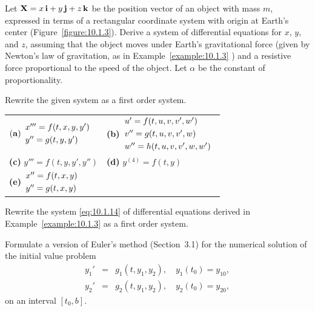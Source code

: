\begin{exerciselist}
  \item\label{exer:10.1.4} Let ${\bf X}=x\,{\bf i}+y\,{\bf j}+z\,{\bf k}$ be the position vector of
        an object with mass $m$, expressed in terms of a rectangular coordinate system with origin
        at Earth's center (Figure~\ref{figure:10.1.3}). Derive a system of differential equations
        for $x$, $y$, and $z$, assuming that the object moves under Earth's gravitational force
        (given by Newton's law of gravitation, as in Example~\ref{example:10.1.3} ) and a resistive
        force proportional to the speed of the object. Let $\alpha$ be the constant of
        proportionality.

  \item\label{exer:10.1.5} Rewrite the given system as a first order system.

  \begin{tabular}[t]{@{}p{168pt}@{}p{168pt}}
    ${\bf(a)}\begin{array}{lcc}x'''=f(t,x,y,y')\\[1\jot]y''= g(t,y,y')\end{array}$ & {\bf (b)}$\begin{array}{lcl}u'= f(t,u,v,v',w')\\[1\jot]v''=g(t,u,v,v',w) \\[1\jot]w''=h(t,u,v,v',w,w')\end{array}$ \\[30pt]
    {\bf (c)} $y'''= f(t,y,y',y'')$                                                & {\bf (d)} $y^{(4)}=f(t,y)$                                                                                         \\[20pt]
    {\bf (e)}$\begin{array}{lcc}x''=f(t,x,y)\\[1\jot]y''= g(t,x,y)\end{array}$
  \end{tabular}

  \item\label{exer:10.1.6} Rewrite the system \eqref{eq:10.1.14} of differential equations derived
        in Example~\ref{example:10.1.3} as a first order system.

  \item\label{exer:10.1.7} Formulate a version of Euler's method (Section~3.1) for the numerical
        solution of the initial value problem
  \[
    \begin{array}{rcl}
      y_{1}' & = & g_{1}(t,y_{1},y_{2}),\quad y_{1}(t_{0})=y_{10}, \\
      y_{2}' & = & g_{2}(t,y_{1},y_{2}),\quad y_{2}(t_{0})=y_{20},
    \end{array}
  \]
  on an interval $[t_{0},b]$.


\end{exerciselist}
